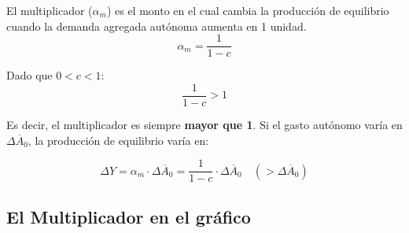 \documentclass[11pt,a4paper]{article}
\newcommand{\barvar}[1]{\overline{#1}}
\begin{document}
\begin{definicionbox}
El multiplicador ($\alpha_m$) es el monto en el cual cambia la producción de equilibrio cuando la demanda agregada autónoma aumenta en 1 unidad.
\[
\alpha_m = \frac{1}{1-c}
\]
\end{definicionbox}

Dado que $0 < c < 1$:
\[
\frac{1}{1-c} > 1
\]

Es decir, el multiplicador es siempre \textbf{mayor que 1}. Si el gasto autónomo varía en $\Delta \barvar{A}_0$, la producción de equilibrio varía en:

\begin{resultadobox}
\[
\Delta Y = \alpha_m \cdot \Delta \barvar{A}_0 = \frac{1}{1-c} \cdot \Delta \barvar{A}_0 \quad (> \Delta \barvar{A}_0)
\]
\end{resultadobox}

\subsection{El Multiplicador en el gráfico}
\end{document}
